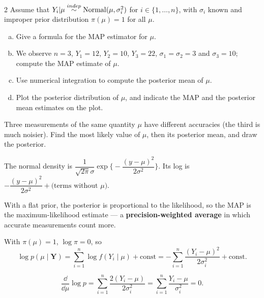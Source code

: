 \documentclass[11pt]{article}
\begin{document}
\begin{problem}{2}
Assume that $Y_i|\mu\overset{indep}{\sim}\mathrm{Normal}(\mu,\sigma_i^2)$ for $i\in\{1,\dots,n\}$, with $\sigma_i$ known and improper prior distribution $\pi(\mu)=1$ for all $\mu$.
\begin{enumerate}[(a)]
\item Give a formula for the MAP estimator for $\mu$.
\item We observe $n=3$, $Y_1=12$, $Y_2=10$, $Y_3=22$, $\sigma_1=\sigma_2=3$ and $\sigma_3=10$; compute the MAP estimate of $\mu$.
\item Use numerical integration to compute the posterior mean of $\mu$.
\item Plot the posterior distribution of $\mu$, and indicate the MAP and the posterior mean estimates on the plot.
\end{enumerate}
\end{problem}

\begin{restate}
Three measurements of the same quantity $\mu$ have different accuracies (the third is much noisier). Find the most likely value of $\mu$, then its posterior mean, and draw the posterior.
\end{restate}

\begin{recall}
The normal density is $\dfrac{1}{\sqrt{2\pi}\sigma}\exp\Big\{-\dfrac{(y-\mu)^2}{2\sigma^2}\Big\}$. Its log is $-\dfrac{(y-\mu)^2}{2\sigma^2}+\text{(terms without }\mu)$.
\end{recall}

\begin{keyidea}
With a flat prior, the posterior is proportional to the likelihood, so the MAP is the maximum-likelihood estimate --- a \textbf{precision-weighted average} in which accurate measurements count more.
\end{keyidea}

\solution
{}
With $\pi(\mu)=1$, $\log\pi=0$, so
\[
\log p(\mu\mid\mathbf Y)=\sum_{i=1}^n\log f(Y_i\mid\mu)+\text{const}=-\sum_{i=1}^n\frac{(Y_i-\mu)^2}{2\sigma_i^2}+\text{const}.
\]

\[
\frac{\dd}{\dd\mu}\log p=\sum_{i=1}^n\frac{2(Y_i-\mu)}{2\sigma_i^2}=\sum_{i=1}^n\frac{Y_i-\mu}{\sigma_i^2}=0.
\]
\end{document}
